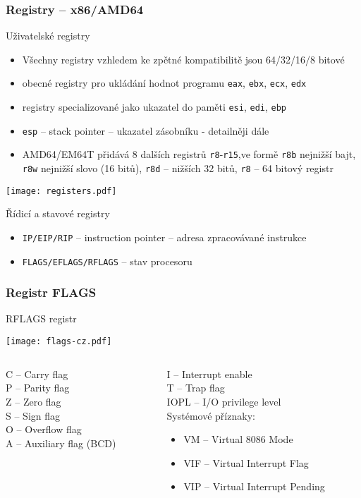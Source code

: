 \documentclass{beamer}
\begin{document}
\begin{frame}[shrink=1.2]
\frametitle{Registry -- x86/AMD64}
\small
Uživatelské registry
\begin{itemize}
\item Všechny registry vzhledem ke zpětné kompatibilitě jsou 64/32/16/8 bitové
\item obecné registry pro ukládání hodnot programu \texttt{eax}, \texttt{ebx}, \texttt{ecx}, \texttt{edx}
\item registry specializované jako ukazatel do paměti \texttt{esi}, \texttt{edi}, \texttt{ebp}
\item \texttt{esp} – stack pointer -- ukazatel zásobníku - detailněji dále
\item AMD64/EM64T přidává 8 dalších registrů \texttt{r8}-\texttt{r15},ve formě \texttt{r8b} nejnižší bajt, \texttt{r8w} nejnižší slovo (16 bitů), \texttt{r8d} – nižších 32 bitů, \texttt{r8} – 64 bitový registr
\end{itemize}
\begin{center}
\texttt{[image: registers.pdf]}
\end{center}
Řídicí a stavové registry
\begin{itemize}
\item \texttt{IP/EIP/RIP} – instruction pointer – adresa zpracovávané instrukce
\item \texttt{FLAGS/EFLAGS/RFLAGS} – stav procesoru
\end{itemize}

\end{frame}



\begin{frame}
\frametitle{Registr FLAGS}
RFLAGS registr
\begin{center}
\texttt{[image: flags-cz.pdf]}
\end{center}
\begin{columns}[t,onlytextwidth]
\begin{column}{0.5\textwidth}
C -- Carry flag\\
P -- Parity flag\\
Z -- Zero flag\\
S -- Sign flag\\
O -- Overflow flag\\
A -- Auxiliary flag (BCD)
\end{column}
\begin{column}{0.5\textwidth}  
I -- Interrupt enable\\
T -- Trap flag\\
IOPL -- I/O privilege level\\
Systémové příznaky:
\begin{itemize}
\item VM -- Virtual 8086 Mode
\item VIF -- Virtual Interrupt Flag
\item VIP -- Virtual Interrupt Pending
\end{itemize}
\end{column}
\end{columns}
\end{frame}
\end{document}
